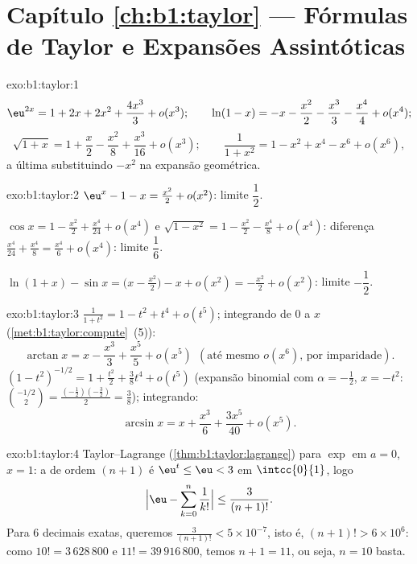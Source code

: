 \section*{Capítulo \ref{ch:b1:taylor} --- Fórmulas de Taylor e Expansões
Assintóticas}

\begin{solution}{exo:b1:taylor:1}
\[
\eu^{2x} = 1 + 2x + 2x^2 + \frac{4x^3}{3} + o(x^3);
\qquad
\ln(1 - x) = -x - \frac{x^2}{2} - \frac{x^3}{3} - \frac{x^4}{4} +
o(x^4);
\]
\[
\sqrt{1+x} = 1 + \frac x2 - \frac{x^2}{8} + \frac{x^3}{16} + o(x^3);
\qquad
\frac{1}{1 + x^2} = 1 - x^2 + x^4 - x^6 + o(x^6),
\]
a última substituindo $-x^2$ na expansão geométrica.
\end{solution}

\begin{solution}{exo:b1:taylor:2}
$\eu^x - 1 - x = \frac{x^2}{2} + o(x^2)$: limite $\dfrac12$.

$\cos x = 1 - \frac{x^2}{2} + \frac{x^4}{24} + o(x^4)$ e
$\sqrt{1 - x^2} = 1 - \frac{x^2}{2} - \frac{x^4}{8} + o(x^4)$:
diferença $\frac{x^4}{24} + \frac{x^4}{8} = \frac{x^4}{6} + o(x^4)$:
limite $\dfrac16$.

$\ln(1+x) - \sin x = \bigl(x - \frac{x^2}{2}\bigr) - x + o(x^2) =
-\frac{x^2}{2} + o(x^2)$: limite $-\dfrac12$.
\end{solution}

\begin{solution}{exo:b1:taylor:3}
$\frac{1}{1+t^2} = 1 - t^2 + t^4 + o(t^5)$; integrando de $0$ a
$x$ (\cref{met:b1:taylor:compute}~(5)):
\[
\arctan x = x - \frac{x^3}{3} + \frac{x^5}{5} + o(x^5)\ \ (\text{até mesmo }o(x^6)\text{, por imparidade}).
\]
$(1 - t^2)^{-1/2} = 1 + \frac{t^2}{2} + \frac38 t^4 + o(t^5)$ (expansão
binomial com $\alpha = -\frac12$, $x = -t^2$:
$\binom{-1/2}{2} = \frac{(-\frac12)(-\frac32)}{2} = \frac38$);
integrando:
\[
\arcsin x = x + \frac{x^3}{6} + \frac{3x^5}{40} + o(x^5) .
\]
\end{solution}

\begin{solution}{exo:b1:taylor:4}
Taylor--Lagrange (\cref{thm:b1:taylor:lagrange}) para $\exp$ em $a =
0$, $x = 1$: a  de ordem $(n+1)$ é $\eu^t \leq \eu < 3$ em
$\intcc{0}{1}$, logo
\[
\Bigl|\eu - \sum_{k=0}^{n} \frac{1}{k!}\Bigr| \leq
\frac{3}{(n+1)!} .
\]
Para $6$ decimais exatas, queremos $\frac{3}{(n+1)!} < 5\times 10^{-7}$,
isto é, $(n+1)! > 6\times 10^{6}$: como $10! = 3\,628\,800$ e $11! =
39\,916\,800$, temos $n + 1 = 11$, ou seja, $n = 10$ basta.
\end{solution}

